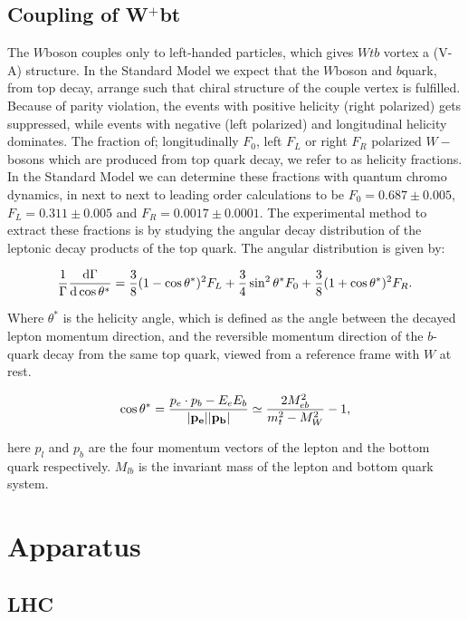 \documentclass[11pt,a4paper]{article}
\begin{document}
\subsection{Coupling of W$^+$bt}
The $W$boson couples only to left-handed particles, which gives $Wtb$ vortex a (V-A) structure. In the Standard Model we expect that the $W$boson and $b$quark, from top decay, arrange such that chiral structure of the couple vertex is fulfilled. Because of parity violation, the events with positive helicity (right polarized) gets suppressed, while events with negative (left polarized) and longitudinal helicity dominates. The fraction of; longitudinally $F_0$, left $F_L$ or right $F_R$ polarized $W-$bosons which are produced from top quark decay, we refer to as helicity fractions. In the Standard Model we can determine these fractions with quantum chromo dynamics, in next to next to leading order calculations to be $F_0 = 0.687 \pm 0.005$, $F_L = 0.311 \pm 0.005$ and $F_R = 0.0017 \pm 0.0001$. The experimental method to extract these fractions is by studying the angular decay distribution of the leptonic decay products of the top quark. The angular distribution is given by:

\begin{equation}
\frac{1}{\Gamma}\dv{\Gamma}{\cos \theta^*} = \frac{3}{8}(1-\cos \theta^*)^2 F_L + \frac{3}{4}\sin^2 \theta^* F_0 + \frac{3}{8}(1+\cos \theta^*)^2 F_R.
\end{equation}

Where $\theta^*$ is the helicity angle, which is defined as the angle between the decayed lepton momentum direction, and the reversible momentum direction of the $b$-quark decay from the same top quark, viewed from a reference frame with $W$ at rest.

\begin{equation}
\cos \theta^* = \frac{p_e \cdot p_b - E_e E_b}{\abs{\vb{p_e}} \abs{\vb{p_b}}} \simeq \frac{2 M_{eb}^2}{m_t^2 - M_W^2} - 1,
\end{equation}

here $p_l$ and $p_b$ are the four momentum vectors of the lepton and the bottom quark respectively. $M_{lb}$ is the invariant mass of the lepton and bottom quark system.

\section{Apparatus}

\subsection{LHC}
\end{document}
